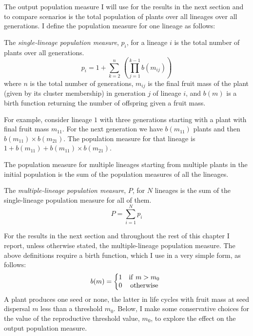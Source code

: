 The output population measure I will use for the results in the next section and
to compare scenarios is the total population of plants over all lineages over
all generations. I define the population measure for one lineage as follows:
\begin{definition}
  The \emph{single-lineage population measure}, $p_i$, for a lineage $i$ is the
  total number of plants over all generations.
\begin{equation*}
p_i = 1 + \sum_{k=2}^{n} \, (\prod_{j=1}^{k-1} b(m_{ij}))
\end{equation*}
where $n$ is the total number of generations, $m_{ij}$ is the final fruit mass
of the plant (given by its cluster membership) in generation $j$ of lineage $i$,
and $b(m)$ is a birth function returning the number of offspring given a fruit
mass.
\end{definition}
For example, consider lineage $1$ with three generations starting
with a plant with final fruit mass \(m_{11}\). For the next generation we have
\(b(m_{11})\) plants and then \(b(m_{11}) \times b(m_{21})\). The population measure
for that lineage is \(1 + b(m_{11}) + b(m_{11}) \times b(m_{21})\).

The population measure for multiple lineages starting from multiple plants in
the initial population is the sum of the population measures of all the
lineages.
\begin{definition}
  The \emph{multiple-lineage population measure}, $P$, for $N$ lineages is the
  sum of the single-lineage population measure for all of them.
  $$
    P = \sum_{i=1}^{N} p_i
  $$
\end{definition}

For the results in the next section and throughout the rest of this chapter I
report, unless otherwise stated, the multiple-lineage population measure.  The
above definitions require a birth function, which I use in a very simple form,
as follows:
\[b( m ) = \left\{ \begin{matrix}
1 & \mathrm{if\ }m > m_{0} \\
0 & \mathrm{otherwise} \\
\end{matrix} \right.\ \] A plant produces one seed or none, the latter in life
cycles with fruit mass at seed dispersal $m$ less than a threshold
\(m_{0}\). Below, I make some conservative choices for the value of the
reproductive threshold value, \(m_{0}\), to explore the effect on the output
population measure.

